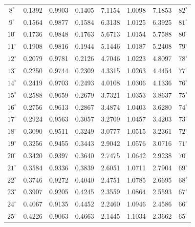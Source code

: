 \documentclass[14pt,a4paper]{extarticle}
\begin{document}
\begin{center}
{{{\begin{tabular}{|>{}c|S[table-format = 2.5]|S[table-format = 2.5]|S[table-format = 2.5]|S[table-format = 3.5]|S[table-format = 2.5]|S[table-format = 3.5]|>{}c|}
$8^{\circ}$  & 0.1392 & 0.9903 & 0.1405 &  7.1154 & 1.0098 &  7.1853 & $82^{\circ}$\\
$9^{\circ}$  & 0.1564 & 0.9877 & 0.1584 &  6.3138 & 1.0125 &  6.3925 & $81^{\circ}$\\
$10^{\circ}$ & 0.1736 & 0.9848 & 0.1763 &  5.6713 & 1.0154 &  5.7588 & $80^{\circ}$\\
$11^{\circ}$ & 0.1908 & 0.9816 & 0.1944 &  5.1446 & 1.0187 &  5.2408 & $79^{\circ}$\\
$12^{\circ}$ &	0.2079 & 0.9781 &	0.2126 &  4.7046 & 1.0223 &  4.8097 & $78^{\circ}$\\
$13^{\circ}$ & 0.2250 & 0.9744 & 0.2309 &  4.3315 & 1.0263 &  4.4454 & $77^{\circ}$\\
$14^{\circ}$ & 0.2419 & 0.9703 & 0.2493 &  4.0108 & 1.0306 &  4.1336 & $76^{\circ}$\\
$15^{\circ}$ & 0.2588 & 0.9659 & 0.2679 &	 3.7321 & 1.0353 &  3.8637 & $75^{\circ}$\\
$16^{\circ}$ & 0.2756 & 0.9613 & 0.2867 &  3.4874 & 1.0403 &  3.6280 & $74^{\circ}$\\
$17^{\circ}$ & 0.2924 & 0.9563 &	0.3057 &  3.2709 & 1.0457 &  3.4203 & $73^{\circ}$\\
$18^{\circ}$ & 0.3090 & 0.9511 & 0.3249 &  3.0777 & 1.0515 &  3.2361 & $72^{\circ}$\\
$19^{\circ}$ & 0.3256 & 0.9455 & 0.3443 &  2.9042 & 1.0576 &  3.0716 & $71^{\circ}$\\
$20^{\circ}$ & 0.3420 &	0.9397 & 0.3640 &  2.7475 & 1.0642 &  2.9238 & $70^{\circ}$\\
$21^{\circ}$ & 0.3584 & 0.9336 & 0.3839 &  2.6051 & 1.0711 &  2.7904 & $69^{\circ}$\\
$22^{\circ}$ & 0.3746 &	0.9272 & 0.4040 &  2.4751 & 1.0785 &  2.6695 & $68^{\circ}$\\
$23^{\circ}$ & 0.3907 & 0.9205 & 0.4245 &  2.3559 & 1.0864 &  2.5593 & $67^{\circ}$\\
$24^{\circ}$ & 0.4067 & 0.9135 & 0.4452 &  2.2460 & 1.0946 &  2.4586 & $66^{\circ}$\\
$25^{\circ}$ & 0.4226 & 0.9063 & 0.4663 &	 2.1445 & 1.1034 &  2.3662 & $65^{\circ}$\\

\end{tabular}}}}
\end{center}
\end{document}

